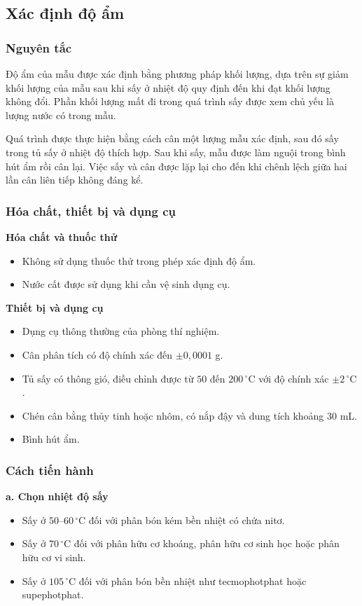 \subsection{Xác định độ ẩm}
\subsubsection{Nguyên tắc}
Độ ẩm của mẫu được xác định bằng phương pháp khối lượng, dựa trên sự giảm khối lượng của mẫu sau khi sấy ở nhiệt độ quy định đến khi đạt khối lượng không đổi. 
Phần khối lượng mất đi trong quá trình sấy được xem chủ yếu là lượng nước có trong mẫu.

Quá trình được thực hiện bằng cách cân một lượng mẫu xác định, sau đó sấy trong tủ sấy ở nhiệt độ thích hợp. 
Sau khi sấy, mẫu được làm nguội trong bình hút ẩm rồi cân lại. 
Việc sấy và cân được lặp lại cho đến khi chênh lệch giữa hai lần cân liên tiếp không đáng kể.

\subsubsection{Hóa chất, thiết bị và dụng cụ}
\noindent\textbf{Hóa chất và thuốc thử}
\begin{itemize}
  \item Không sử dụng thuốc thử trong phép xác định độ ẩm.
  \item Nước cất được sử dụng khi cần vệ sinh dụng cụ.
\end{itemize}

\noindent\textbf{Thiết bị và dụng cụ}
\begin{itemize}
  \item Dụng cụ thông thường của phòng thí nghiệm.
  \item Cân phân tích có độ chính xác đến $\pm0{,}0001$ g.
  \item Tủ sấy có thông gió, điều chỉnh được từ $50$ đến $200\,^{\circ}\mathrm{C}$ với độ chính xác $\pm2\,^{\circ}\mathrm{C}$.
  \item Chén cân bằng thủy tinh hoặc nhôm, có nắp đậy và dung tích khoảng 30 mL.
  \item Bình hút ẩm.
\end{itemize}

\subsubsection{Cách tiến hành}
\noindent\textbf{a. Chọn nhiệt độ sấy}
\begin{itemize}
  \item Sấy ở $50$--$60\,^{\circ}\mathrm{C}$ đối với phân bón kém bền nhiệt có chứa nitơ.
  \item Sấy ở $70\,^{\circ}\mathrm{C}$ đối với phân hữu cơ khoáng, phân hữu cơ sinh học hoặc phân hữu cơ vi sinh.
  \item Sấy ở $105\,^{\circ}\mathrm{C}$ đối với phân bón bền nhiệt như tecmophotphat hoặc supephotphat.
\end{itemize}

